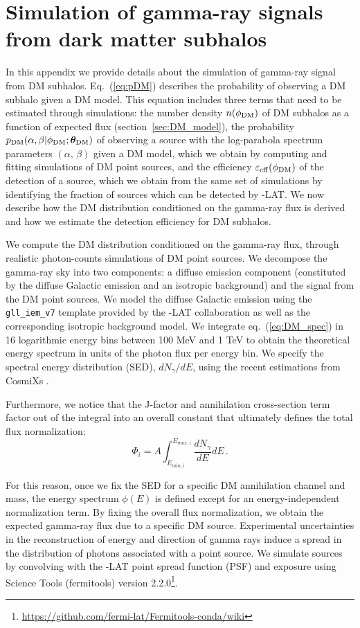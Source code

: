 \section{Simulation of gamma-ray signals from dark matter subhalos}
\label{app:sim-ps}

In this appendix we provide details about the simulation of gamma-ray signal from DM subhalos.
Eq.~(\ref{eq:pDM}) describes the probability of observing a DM subhalo 
given a DM model.
This equation includes three terms that need to be estimated through simulations: 
the number density $n(\phi_{\rm DM})$ of DM subhalos as a function of expected flux (section~\ref{sec:DM_model}), the probability $p_{\rm DM}(\alpha,\beta|\phi_{\rm DM};\boldsymbol{\theta}_{\rm DM})$  of observing a source with the log-parabola spectrum parameters $(\alpha,\,\beta)$ given a DM model, which we obtain by computing and fitting simulations of DM point sources, and the efficiency $\varepsilon_{\rm eff}(\phi_{\rm DM})$ of the detection of a source, which we obtain from the same set of simulations by identifying the fraction of sources which can be detected by \Fermi-LAT.  
We now describe how the DM distribution conditioned on the gamma-ray flux is derived and how we estimate the detection efficiency for DM subhalos.

We compute the DM distribution  conditioned on the gamma-ray flux, through realistic photon-counts simulations of DM point sources. 
We decompose the gamma-ray sky into two  components: a diffuse emission component (constituted by the diffuse Galactic emission and an isotropic background) and the signal from the DM point sources. 
We model the diffuse Galactic emission using the \verb|gll_iem_v7| template provided by the \Fermi-LAT collaboration as well as the corresponding isotropic background model.
We integrate eq.~(\ref{eq:DM_spec}) in 16 logarithmic energy bins between 100 MeV and 1 TeV to obtain the theoretical energy spectrum in units of the photon flux per energy bin.
We specify the spectral energy distribution (SED), $dN_\gamma/dE$, using the recent estimations from CosmiXs \cite{Arina:2023eic}.

Furthermore, we notice that the J-factor and annihilation cross-section term factor out of the integral into an overall constant that ultimately defines the total flux normalization: 
\begin{equation}
   \Phi_i = A \int_{E_{min, i}}^{E_{max,i} }\frac{dN_\gamma}{dE}dE \,.
\end{equation}

For this reason, once we fix the SED for a specific DM annihilation channel and mass, the energy spectrum $\phi(E)$ is defined except for an energy-independent normalization term. 
By fixing the overall flux normalization, we obtain the expected gamma-ray flux due to a specific DM source. 
Experimental uncertainties in the reconstruction of energy and direction of gamma rays induce a spread in the distribution of photons associated with a point source.
We simulate sources by convolving with the \Fermi-LAT point spread function (PSF) and exposure
using {\Fermi} Science Tools (fermitools) version 2.2.0\footnote{\url{https://github.com/fermi-lat/Fermitools-conda/wiki}}.

